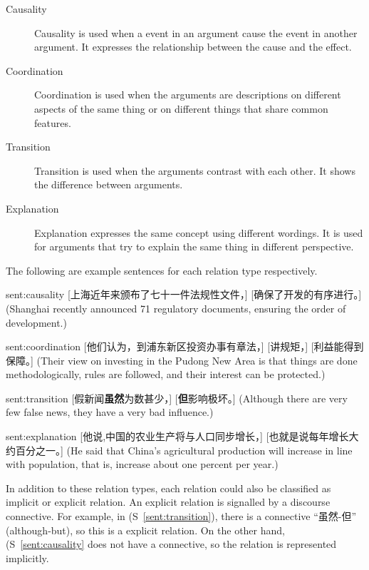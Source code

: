 \begin{description}
\item[Causality] Causality is used when a event in an argument cause the event
    in another argument. It expresses the relationship between the cause
    and the effect.
\item[Coordination] Coordination is used when the arguments are
    descriptions on different aspects of the same thing or
    on different things that share common features.
\item[Transition] Transition is used when the arguments contrast with each other.
    It shows the difference between arguments.
\item[Explanation] Explanation expresses the same concept using different wordings.
    It is used for arguments that try to explain the same thing in different perspective.
\end{description}

The following are example sentences for each relation type respectively.

\begin{sent}{sent:causality}{}
    [上海近年来颁布了七十一件法规性文件，] [确保了开发的有序进行。]
    (Shanghai recently announced 71 regulatory documents, ensuring the order of development.)
\end{sent}

\begin{sent}{sent:coordination}{}
    [他们认为，到浦东新区投资办事有章法，] [讲规矩，] [利益能得到保障。]
    (Their view on investing in the Pudong New Area is that things are done methodologically,
    rules are followed, and their interest can be protected.)
\end{sent}

\begin{sent}{sent:transition}{}
    [假新闻\textbf{虽然}为数甚少，] [\textbf{但}影响极坏。]
    (Although there are very few false news, they have a very bad influence.)
\end{sent}

\begin{sent}{sent:explanation}{}
    [他说,中国的农业生产将与人口同步增长，] [也就是说每年增长大约百分之一。]
    (He said that China's agricultural production will increase in line with
    population, that is, increase about one percent per year.)
\end{sent}

In addition to these relation types, each relation could also be classified as implicit
or explicit relation. An explicit relation is signalled by a discourse connective. For
example, in (S~\ref{sent:transition}), there is a connective ``虽然-但'' (although-but),
so this is a explicit relation. On the other hand, (S~\ref{sent:causality} does not
have a connective, so the relation is represented implicitly.


